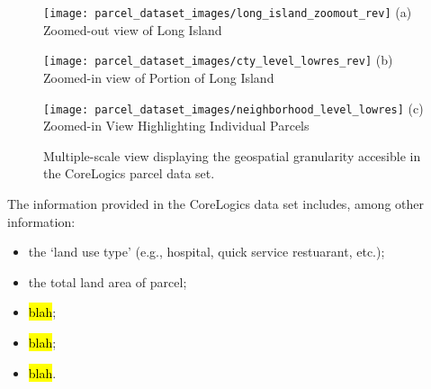 	\begin{figure}[!htb]
		\centering
			\begin{minipage}{0.3\textwidth}
				\centering
				\texttt{[image: parcel\_dataset\_images/long\_island\_zoomout\_rev]} %
				\footnotesize (a) Zoomed-out view of Long Island
			\end{minipage}\hfill
			\begin{minipage}{0.3\textwidth}
				\centering
				\texttt{[image: parcel\_dataset\_images/cty\_level\_lowres\_rev]} %
				\footnotesize (b) Zoomed-in view of Portion of Long Island		
			\end{minipage}\hfill
			\begin{minipage}{0.3\textwidth}
				\centering
				\texttt{[image: parcel\_dataset\_images/neighborhood\_level\_lowres]} %
				\footnotesize (c) Zoomed-in View Highlighting Individual Parcels
			\end{minipage}\hfill
		\caption{Multiple-scale view displaying the geospatial granularity accesible in the CoreLogics parcel data set.}
		\label{fig:parcelview}
	\end{figure}

The information provided in the CoreLogics data set includes, among other information:

\begin{itemize}
	\item the `land use type' (e.g., hospital, quick service restuarant, etc.);
	\item the total land area of parcel;
	\item \hl{blah};
	\item \hl{blah};
	\item \hl{blah}.
\end{itemize}

